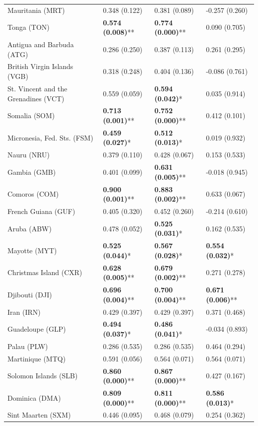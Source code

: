 \begin{longtable}{p{4cm}p{3cm}p{3cm}p{3cm}}
Mauritania (MRT) & 0.348 (0.122) & 0.381 (0.089) & -0.257 (0.260) \\
Tonga (TON) & \textbf{0.574 (0.008)}** & \textbf{0.774 (0.000)}** & 0.090 (0.705) \\
Antigua and Barbuda (ATG) & 0.286 (0.250) & 0.387 (0.113) & 0.261 (0.295) \\
British Virgin Islands (VGB) & 0.318 (0.248) & 0.404 (0.136) & -0.086 (0.761) \\
St. Vincent and the Grenadines (VCT) & 0.559 (0.059) & \textbf{0.594 (0.042)}* & 0.035 (0.914) \\
Somalia (SOM) & \textbf{0.713 (0.001)}** & \textbf{0.752 (0.000)}** & 0.412 (0.101) \\
Micronesia, Fed. Sts. (FSM) & \textbf{0.459 (0.027)}* & \textbf{0.512 (0.013)}* & 0.019 (0.932) \\
Nauru (NRU) & 0.379 (0.110) & 0.428 (0.067) & 0.153 (0.533) \\
Gambia (GMB) & 0.401 (0.099) & \textbf{0.631 (0.005)}** & -0.018 (0.945) \\
Comoros (COM) & \textbf{0.900 (0.001)}** & \textbf{0.883 (0.002)}** & 0.633 (0.067) \\
French Guiana (GUF) & 0.405 (0.320) & 0.452 (0.260) & -0.214 (0.610) \\
Aruba (ABW) & 0.478 (0.052) & \textbf{0.525 (0.031)}* & 0.162 (0.535) \\
Mayotte (MYT) & \textbf{0.525 (0.044)}* & \textbf{0.567 (0.028)}* & \textbf{0.554 (0.032)}* \\
Christmas Island (CXR) & \textbf{0.628 (0.005)}** & \textbf{0.679 (0.002)}** & 0.271 (0.278) \\
Djibouti (DJI) & \textbf{0.696 (0.004)}** & \textbf{0.700 (0.004)}** & \textbf{0.671 (0.006)}** \\
Iran (IRN) & 0.429 (0.397) & 0.429 (0.397) & 0.371 (0.468) \\
Guadeloupe (GLP) & \textbf{0.494 (0.037)}* & \textbf{0.486 (0.041)}* & -0.034 (0.893) \\
Palau (PLW) & 0.286 (0.535) & 0.286 (0.535) & 0.464 (0.294) \\
Martinique (MTQ) & 0.591 (0.056) & 0.564 (0.071) & 0.564 (0.071) \\
Solomon Islands (SLB) & \textbf{0.860 (0.000)}** & \textbf{0.867 (0.000)}** & 0.427 (0.167) \\
Dominica (DMA) & \textbf{0.809 (0.000)}** & \textbf{0.811 (0.000)}** & \textbf{0.586 (0.013)}* \\
Sint Maarten (SXM) & 0.446 (0.095) & 0.468 (0.079) & 0.254 (0.362) \\

\end{longtable}
